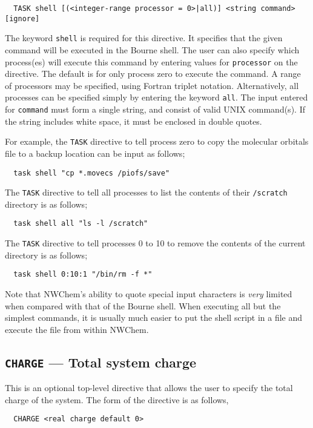 \begin{verbatim}
  TASK shell [(<integer-range processor = 0>|all)] <string command> [ignore]
\end{verbatim}

The keyword \verb+shell+ is required for this directive.  It specifies
that the given command will be executed in the Bourne shell.  The user
can also specify which process(es) will execute this command by
entering values for \verb+processor+ on the directive.  The default is
for only process zero to execute the command.  A range of processors
may be specified, using Fortran triplet notation.  Alternatively, all
processes can be specified simply by entering the keyword \verb+all+.
The input entered for \verb+command+ must form a single string, and
consist of valid UNIX command(s).  If the string includes white space,
it must be enclosed in double quotes.

For example, the \verb+TASK+ directive to tell process zero to copy the 
molecular orbitals file to a backup location can be input as follows;

\begin{verbatim}
  task shell "cp *.movecs /piofs/save"
\end{verbatim}

The \verb+TASK+ directive to tell all processes to list the contents of 
their \verb+/scratch+ directory is as follows;

\begin{verbatim}
  task shell all "ls -l /scratch"
\end{verbatim}

The \verb+TASK+ directive to tell processes 0 to 10 to remove the 
contents of the current directory is as follows;

\begin{verbatim}
  task shell 0:10:1 "/bin/rm -f *"
\end{verbatim}

Note that NWChem's ability to quote special input characters is {\em
  very} limited when compared with that of the Bourne shell.  When
executing all but the simplest commands, it is usually much easier to
put the shell script in a file and execute the file from within
NWChem.

\subsection{{\tt CHARGE} --- Total system charge}
\label{sec:charge}

This is an optional top-level directive that allows the user to specify
the total charge of the system.  The form of the directive is as follows,
\begin{verbatim}
  CHARGE <real charge default 0>
\end{verbatim}

